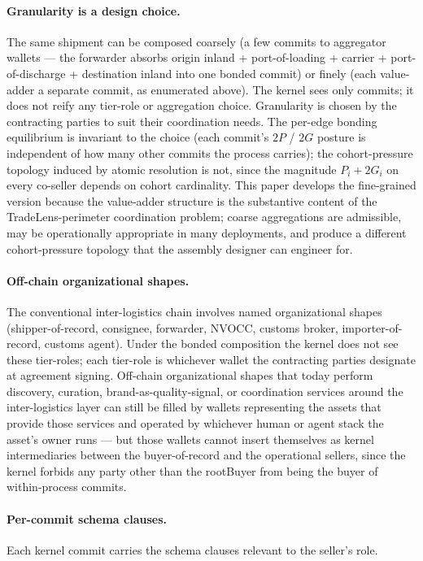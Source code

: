 \documentclass[11pt,a4paper]{article}
\theoremstyle{definition}
\theoremstyle{remark}
\newcommand{\pay}{P}
\newcommand{\cumval}{G}
\begin{document}
\paragraph{Granularity is a design choice.}
The same shipment can be composed coarsely (a few commits to
aggregator wallets --- the forwarder absorbs origin inland +
port-of-loading + carrier + port-of-discharge + destination inland
into one bonded commit) or finely (each value-adder a separate
commit, as enumerated above). The kernel sees only commits; it
does not reify any tier-role or aggregation choice. Granularity is
chosen by the contracting parties to suit their coordination
needs. The per-edge bonding equilibrium is invariant to the
choice (each commit's $2\pay$ / $2\cumval$ posture is independent
of how many other commits the process carries); the cohort-pressure
topology induced by atomic resolution is not, since the magnitude
$\pay_i + 2\cumval_i$ on every co-seller depends on cohort
cardinality. This paper develops the fine-grained version because
the value-adder structure is the substantive content of the
TradeLens-perimeter coordination problem; coarse aggregations are
admissible, may be operationally appropriate in many deployments,
and produce a different cohort-pressure topology that the assembly
designer can engineer for.

\paragraph{Off-chain organizational shapes.}
The conventional inter-logistics chain involves named
organizational shapes (shipper-of-record, consignee, forwarder,
NVOCC, customs broker, importer-of-record, customs agent). Under
the bonded composition the kernel does not see these tier-roles;
each tier-role is whichever wallet the contracting parties
designate at agreement signing. Off-chain organizational shapes
that today perform discovery, curation, brand-as-quality-signal,
or coordination services around the inter-logistics layer can
still be filled by wallets representing the assets that provide
those services and operated by whichever human or agent stack
the asset's owner runs --- but those wallets cannot insert
themselves as kernel intermediaries between the buyer-of-record
and the operational sellers, since the kernel forbids any party
other than the rootBuyer from being the buyer of within-process
commits.

\paragraph{Per-commit schema clauses.}
Each kernel commit carries the schema clauses relevant to the
seller's role.
\end{document}
